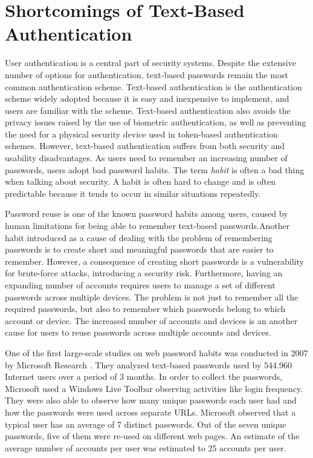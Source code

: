 \section{Shortcomings of Text-Based Authentication} \label{sec:shortcomings}

  User authentication is a central part of security systems. Despite the extensive number of options for authentication, text-based passwords remain the most common authentication scheme. Text-based authentication is the authentication scheme widely adopted because it is easy and inexpensive to implement, and users are familiar with the scheme. Text-based authentication also avoids the privacy issues raised by the use of biometric authentication, as well as preventing the need for a physical security device used in token-based authentication schemes. However, text-based authentication suffers from both security and usability disadvantages. As users need to remember an increasing number of passwords, users adopt bad password habits. The term {\it habit} is often a bad thing when talking about security. A habit is often hard to change and is often predictable because it tends to occur in similar situations repeatedly.

  Password reuse is one of the known password habits among users, caused by human limitations for being able to remember text-based passwords.Another habit introduced as a cause of dealing with the problem of remembering passwords is to create short and meaningful passwords that are easier to remember. However, a consequence of creating short passwords is a vulnerability for brute-force attacks, introducing a security risk. Furthermore, having an expanding number of accounts requires users to manage a set of different passwords across multiple devices. The problem is not just to remember all the required passwords, but also to remember which passwords belong to which account or device. The increased number of accounts and devices is an another cause for users to reuse passwords across multiple accounts and devices.

  One of the first large-scale studies on web password habits was conducted in 2007 by Microsoft Research \cite{habits1}. They analyzed text-based passwords used by 544.960 Internet users over a period of 3 months. In order to collect the passwords, Microsoft used a Windows Live Toolbar observing activities like login frequency. They were also able to observe how many unique passwords each user had and how the passwords were used across separate URLs. Microsoft observed that a typical user has an average of 7 distinct passwords. Out of the seven unique passwords, five of them were re-used on different web pages. An estimate of the average number of accounts per user was estimated to 25 accounts per user.

